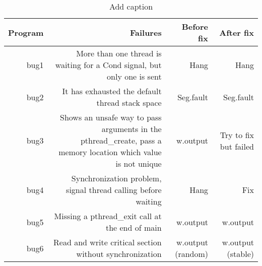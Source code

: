 \begin{table}[htbp]
  \centering
  \caption{Add caption}
    \begin{tabular}{rrrr}
    \toprule
    Program & Failures & Before fix & After fix \\
    \midrule
    bug1 & More than one thread is waiting for a Cond signal, but only one is sent & Hang & Hang \\
    bug2 & It has exhausted the default thread stack space & Seg.fault & Seg.fault \\
    bug3 & Shows an unsafe way to pass arguments in the pthread\_create, pass a memory location which value is not unique & w.output & Try to fix but failed \\
    bug4 & Synchronization problem,  signal thread calling before waiting & Hang & Fix \\
    bug5 & Missing a pthread\_exit call at the end of main & w.output & w.output \\
    bug6 & Read and write critical section without synchronization & w.output (random) & w.output (stable) \\
    \bottomrule
    \end{tabular}%
  \label{tab:addlabel}%
\end{table}%
